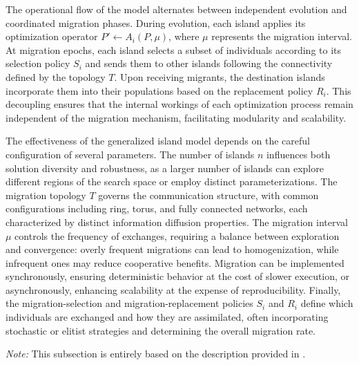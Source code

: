 The operational flow of the model alternates between independent evolution and coordinated migration phases. During evolution, each island applies its optimization operator \( P' \leftarrow A_i(P, \mu) \), where \( \mu \) represents the migration interval. At migration epochs, each island selects a subset of individuals according to its selection policy \( S_i \) and sends them to other islands following the connectivity defined by the topology \( T \). Upon receiving migrants, the destination islands incorporate them into their populations based on the replacement policy \( R_i \). This decoupling ensures that the internal workings of each optimization process remain independent of the migration mechanism, facilitating modularity and scalability.

The effectiveness of the generalized island model depends on the careful configuration of several parameters. The number of islands \( n \) influences both solution diversity and robustness, as a larger number of islands can explore different regions of the search space or employ distinct parameterizations. The migration topology \( T \) governs the communication structure, with common configurations including ring, torus, and fully connected networks, each characterized by distinct information diffusion properties. The migration interval \( \mu \) controls the frequency of exchanges, requiring a balance between exploration and convergence: overly frequent migrations can lead to homogenization, while infrequent ones may reduce cooperative benefits. Migration can be implemented synchronously, ensuring deterministic behavior at the cost of slower execution, or asynchronously, enhancing scalability at the expense of reproducibility. Finally, the migration-selection and migration-replacement policies \( S_i \) and \( R_i \) define which individuals are exchanged and how they are assimilated, often incorporating stochastic or elitist strategies and determining the overall migration rate.

\textit{Note:} This subsection is entirely based on the description provided in \parencite[pp.~151-169]{izzo2012generalislandmodel}.

